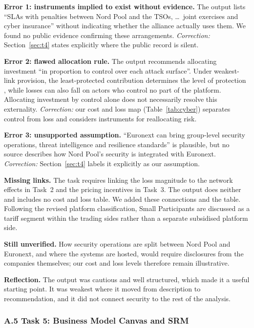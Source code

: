 \textbf{Error 1: instruments implied to exist without evidence.}
The output lists ``SLAs with penalties between Nord Pool
and the TSOs, \dots\ joint exercises and cyber insurance''
without indicating whether the alliance actually uses them.
We found no public evidence confirming these arrangements.
\emph{Correction:} Section~\ref{sec:t4}
states explicitly where the public record is silent.

\textbf{Error 2: flawed allocation rule.}
The output recommends allocating investment
``in proportion to control over each attack surface''.
Under weakest-link provision, the least-protected
contribution determines the level of protection
\citep{Hirshleifer1983}, while losses can also fall
on actors who control no part of the platform.
Allocating investment by control alone does not
necessarily resolve this externality.
\emph{Correction:} our cost and loss map
(Table~\ref{tab:cyber}) separates control from loss
and considers instruments for reallocating risk.

\textbf{Error 3: unsupported assumption.}
``Euronext can bring group-level security operations,
threat intelligence and resilience standards''
is plausible, but no source describes how Nord Pool's
security is integrated with Euronext.
\emph{Correction:} Section~\ref{sec:t4}
labels it explicitly as our assumption.

\textbf{Missing links.}
The task requires linking the loss magnitude
to the network effects in Task~2
and the pricing incentives in Task~3.
The output does neither and includes no cost and loss table.
We added these connections and the table.
Following the revised platform classification,
Small Participants are discussed as a tariff segment
within the trading sides rather than a separate
subsidised platform side.

\textbf{Still unverified.} How security operations are split
between Nord Pool and Euronext, and where the systems are
hosted, would require disclosures from the companies
themselves; our cost and loss levels therefore remain
illustrative.

\textbf{Reflection.}
The output was cautious and well structured,
which made it a useful starting point.
It was weakest where it moved from description
to recommendation, and it did not connect security
to the rest of the analysis.

\subsubsection*{A.5 Task 5: Business Model Canvas and SRM}

